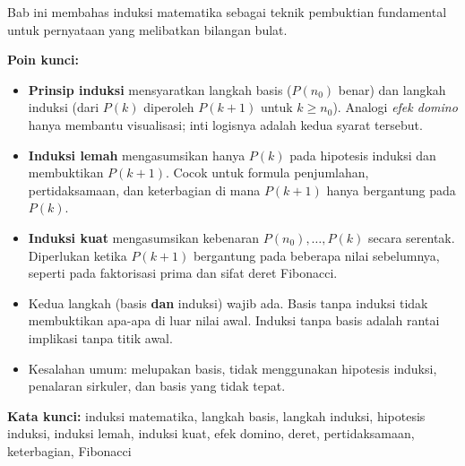 \documentclass[../main]{subfiles}
\begin{document}

\begin{rangkuman}
Bab ini membahas induksi matematika sebagai teknik pembuktian fundamental untuk pernyataan yang melibatkan bilangan bulat.

\textbf{Poin kunci:}
\begin{itemize}
  \item \textbf{Prinsip induksi} mensyaratkan langkah basis ($P(n_0)$ benar) dan langkah induksi (dari $P(k)$ diperoleh $P(k+1)$ untuk $k \geq n_0$). Analogi \textit{efek domino} hanya membantu visualisasi; inti logisnya adalah kedua syarat tersebut.
  \item \textbf{Induksi lemah} mengasumsikan hanya $P(k)$ pada hipotesis induksi dan membuktikan $P(k+1)$. Cocok untuk formula penjumlahan, pertidaksamaan, dan keterbagian di mana $P(k+1)$ hanya bergantung pada $P(k)$.
  \item \textbf{Induksi kuat} mengasumsikan kebenaran $P(n_0), \ldots, P(k)$ secara serentak. Diperlukan ketika $P(k+1)$ bergantung pada beberapa nilai sebelumnya, seperti pada faktorisasi prima dan sifat deret Fibonacci.
  \item Kedua langkah (basis \textbf{dan} induksi) wajib ada. Basis tanpa induksi tidak membuktikan apa-apa di luar nilai awal. Induksi tanpa basis adalah rantai implikasi tanpa titik awal.
  \item Kesalahan umum: melupakan basis, tidak menggunakan hipotesis induksi, penalaran sirkuler, dan basis yang tidak tepat.
\end{itemize}

\textbf{Kata kunci:} induksi matematika, langkah basis, langkah induksi, hipotesis induksi, induksi lemah, induksi kuat, efek domino, deret, pertidaksamaan, keterbagian, Fibonacci
\end{rangkuman}

\ifSubfilesClassLoaded{
  \renewcommand{\bibname}{Daftar Pustaka}
  
  
}{}
\end{document}
